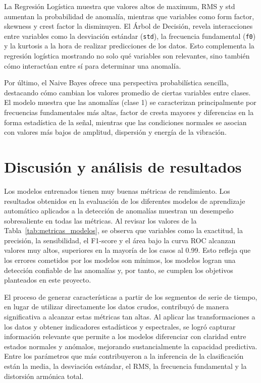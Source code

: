 \documentclass[11pt,a4paper,spanish]{book}
\numberwithin{equation}{chapter}
\numberwithin{figure}{chapter}
\begin{document}
La Regresión Logística muestra que valores altos de maximum, RMS y std aumentan la 
probabilidad de anomalía, mientras que variables como form factor, skewness y crest 
factor la disminuyen.  El Árbol de Decisión, revela interacciones entre variables como 
la desviación estándar (\lstinline|std|), la frecuencia fundamental (\lstinline|f0|) y 
la kurtosis a la hora de realizar predicciones de los datos. Esto complementa la 
regresión logística mostrando no solo qué variables son relevantes, sino también cómo 
interactúan entre sí para determinar una anomalía.


Por último, el Naive Bayes ofrece una perspectiva probabilística sencilla, destacando 
cómo cambian los valores promedio de ciertas variables entre clases. 
El modelo muestra que las anomalías (clase 1) se caracterizan principalmente por 
frecuencias fundamentales más altas, factor de cresta mayores y diferencias en la forma 
estadística de la señal, mientras que las condiciones normales se asocian con valores 
más bajos de amplitud, dispersión y energía de la vibración. 



\chapter{Discusión y análisis de resultados}

Los modelos entrenados tienen muy buenas métricas de rendimiento. 
Los resultados obtenidos en la evaluación de los diferentes modelos de aprendizaje 
automático aplicados a la detección de anomalías muestran un desempeño sobresaliente 
en todas las métricas. 
Al revisar los valores de la Tabla~\ref{tab:metricas_modelos}, se observa que variables 
como la exactitud, 
la precisión, la sensibilidad, el F1-score y el área bajo la curva ROC alcanzan 
valores muy altos, superiores en la mayoría de los casos al 0.99. Esto refleja que los 
errores cometidos por los modelos son mínimos, los modelos logran una detección 
confiable de las anomalías y, por tanto, se cumplen los objetivos planteados en 
este proyecto.


El proceso de generar características a partir de los segmentos de serie de tiempo, 
en lugar de utilizar directamente los datos crudos, contribuyó de manera significativa 
a alcanzar estas métricas tan altas. Al aplicar las transformaciones a los datos y 
obtener indicadores estadísticos y espectrales, se logró capturar información relevante 
que permite a los modelos diferenciar con claridad entre estados normales y anómalos, 
mejorando sustancialmente la capacidad predictiva. Entre los parámetros que más 
contribuyeron a la inferencia de la clasificación están la media, la desviación estándar, 
el RMS, la frecuencia fundamental y la distorsión armónica total.
\end{document}

